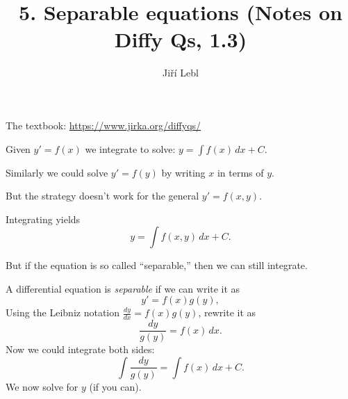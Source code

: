 \documentclass[10pt,aspectratio=169]{beamer}
\author{Ji\v{r}\'i Lebl}
\institute[OSU]{%
Oklahoma State University%
}
\title{5. Separable equations (Notes on Diffy Qs, 1.3)}
\date{}
\begin{document}
\begin{frame}
\titlepage


\begin{center}
The textbook: \url{https://www.jirka.org/diffyqs/}
\end{center}
\end{frame}

\begin{frame}
Given
$y' = f(x)$ we integrate to solve: $y = \int f(x) \,dx + C$. 

\medskip
\pause

Similarly we could solve $y' = f(y)$ by writing $x$ in terms of $y$.

\medskip
\pause

But the strategy doesn't work for the general $y' = f(x,y)$.

\medskip
\pause

Integrating yields
\[
y = \int f(x,y) \,dx + C .
\]

\medskip
\pause

But if the equation is so called ``separable,'' then we can
still integrate.

\end{frame}

\begin{frame}

A differential equation is \emph{separable} if we can write it as
\[
y' = f(x)g(y) ,
\]
\pause
Using the Leibniz notation $\frac{dy}{dx} = f(x)g(y)$, rewrite it as
\[
\frac{dy}{g(y)} = f(x) \,dx .
\]
\pause
Now we could integrate both sides:
\[
\int \frac{dy}{g(y)} = \int f(x) \,dx + C .
\]
\pause
We now solve for $y$ (if you can).

\end{frame}
\end{document}
